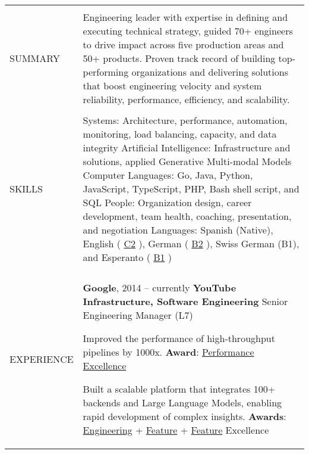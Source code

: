 \documentclass[letterpaper,10pt,oneside]{article}
\newcommand{\DatestampY}[1]{#1}
\newcommand{\itemspacing}{\vspace{0.10cm}}
\newcommand{\sref}[2]{%
    \href{https://0/local/attachments/#1}{\textcolor{hiddenblue}{#2}}%
}
\newenvironment{body}
{\par\par
\begin{longtable}{p{0.145\textwidth}p{0.81\textwidth}}}
{\par\end{longtable}\par}
\renewcommand{\section}[3]{\\[-0.35cm]\pdfbookmark[2]{#2}{#3}\\%
\raggedleft  %
{\fontsize{9.5pt}{9.5pt}\selectfont\bfseries\raggedright%
\MakeUppercase{#1}}&}
\begin{document}
\begin{body}


\section{Summary}{Summary}{PDF:Summary}

Engineering leader with expertise in defining and executing technical strategy, guided 70+ engineers to drive impact across five production areas and 50+ products. Proven track record of building top-performing organizations and delivering solutions that boost engineering velocity and system reliability, performance, efficiency, and scalability.


\section{Skills}{Skills}{PDF:Skills}
Systems: Architecture, performance, automation, monitoring, load balancing, capacity, and data integrity\newline
Artificial Intelligence: Infrastructure and solutions, applied Generative Multi-modal Models\newline
Computer Languages: Go, Java, Python, JavaScript, TypeScript, PHP, Bash shell script, and SQL\newline
People: Organization design, career development, team health, coaching, presentation, and negotiation\newline
Languages: Spanish (Native), English (\sref{Diploma-ESOLCPE.pdf}{C2}), German (\sref{Diploma-GoetheDeutsch-B2.pdf}{B2}), Swiss German (B1), and Esperanto (\sref{Diploma-EAB-Esperanto-Meznivela.pdf}{B1})


\section{Experience}{Experience}{PDF:Experience}

\textbf{Google}, \DatestampY{2014} -- currently \vspace{0.06cm} \newline
\phantom{g}\textbf{YouTube Infrastructure, Software Engineering} \textemdash{ }Senior Engineering Manager (L7)
\begin{comp}
\item Improved the performance of high-throughput pipelines by 1000x. \textbf{Award}: \sref{Google-Award-PerformanceExcellence.pdf}{Performance Excellence}
\item Built a scalable platform that integrates 100+ backends and Large Language Models, enabling rapid development of complex insights. \textbf{Awards}: \sref{Award-EngineeringExcellenceImpact.pdf}{Engineering} + \sref{Google-Award-FeatureExcellence.pdf}{Feature} + \sref{Google-Award-FeatureExcellence2.pdf}{Feature} Excellence
\end{comp}
\itemspacing


\end{body}
\end{document}
